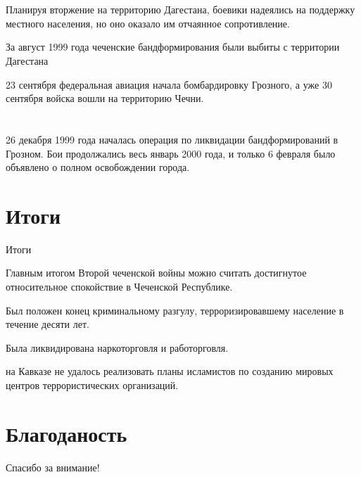 \section{}
\begin{frame}{}

Планируя вторжение на территорию Дагестана, боевики надеялись на поддержку местного населения, но оно оказало им отчаянное сопротивление.

За август 1999 года чеченские бандформирования были выбиты с территории Дагестана

23 сентября федеральная авиация начала бомбардировку Грозного, а уже 30 сентября войска вошли на территорию Чечни.

\end{frame}


\section{}
\begin{frame}{}

26 декабря 1999 года началась операция по ликвидации бандформирований в Грозном. Бои продолжались весь январь 2000 года, и только 6 февраля было объявлено о полном освобождении города.

\end{frame}


\section{Итоги}
\begin{frame}{Итоги}

	Главным итогом Второй чеченской войны можно считать достигнутое относительное спокойствие в Чеченской Республике.

	Был положен конец криминальному разгулу, терроризировавшему население в течение десяти лет.

	Была ликвидирована наркоторговля и работорговля.

	на Кавказе не удалось реализовать планы исламистов по созданию мировых центров террористических организаций.

\end{frame}


\section{Благоданость}
\begin{frame}
	\centering
	\huge
	Спасибо за внимание!
\end{frame}



